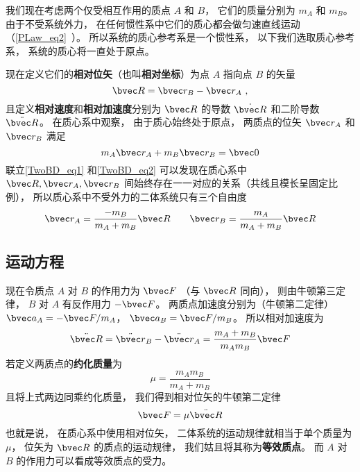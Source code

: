 

我们现在考虑两个仅受相互作用的质点 $A$ 和 $B$， 它们的质量分别为 $m_A$ 和 $m_B$。 由于不受系统外力， 在任何惯性系中它们的质心都会做匀速直线运动（\autoref{PLaw_eq2}~）。 所以系统的质心参考系是一个惯性系， 以下我们选取质心参考系， 系统的质心将一直处于原点。

现在定义它们的\textbf{相对位矢}（也叫\textbf{相对坐标}）为点 $A$ 指向点 $B$ 的矢量
\begin{equation}\label{TwoBD_eq1}
\bvec R = \bvec r_B - \bvec r_A~,
\end{equation}
且定义\textbf{相对速度}和\textbf{相对加速度}分别为 $\bvec R$ 的导数 $\dot{\bvec R}$ 和二阶导数 $\ddot{\bvec R}$。
在质心系中观察， 由于质心始终处于原点， 两质点的位矢 $\bvec r_A$ 和 $\bvec r_B$ 满足
\begin{equation}\label{TwoBD_eq2}
m_A \bvec r_A + m_B \bvec r_B = \bvec 0
\end{equation}
联立\autoref{TwoBD_eq1} 和\autoref{TwoBD_eq2} 可以发现在质心系中 $\bvec R, \bvec r_A, \bvec r_B$ 间始终存在一一对应的关系（共线且模长呈固定比例）， 所以质心系中不受外力的二体系统只有三个自由度
\begin{equation}\label{TwoBD_eq3}
\bvec r_A = \frac{-m_B}{m_A + m_B} \bvec R \qquad
\bvec r_B = \frac{m_A}{m_A + m_B} \bvec R
\end{equation}

\subsection{运动方程}

现在令质点 $A$ 对 $B$ 的作用力为 $\bvec F$ （与 $\bvec R$ 同向）， 则由牛顿第三定律， $B$ 对 $A$ 有反作用力 $- \bvec F$。 两质点加速度分别为（牛顿第二定律） $\bvec a_A =  -\bvec F/m_A$， $\bvec a_B =  \bvec F/m_B$。 所以相对加速度为
\begin{equation}
\ddot{\bvec R} = \ddot{\bvec r}_B - \ddot{\bvec r}_A = \frac{m_A+m_B}{m_Am_B} \bvec F
\end{equation}
若定义两质点的\textbf{约化质量}为
\begin{equation}
\mu = \frac{m_A m_B}{m_A + m_B}
\end{equation}
且将上式两边同乘约化质量， 我们得到相对位矢的牛顿第二定律
\begin{equation}\label{TwoBD_eq6}
\bvec F = \mu\ddot{\bvec R}
\end{equation}
也就是说， 在质心系中使用相对位矢， 二体系统的运动规律就相当于单个质量为 $\mu$， 位矢为 $\bvec R$ 的质点的运动规律， 我们姑且将其称为\textbf{等效质点}。 而 $A$ 对 $B$ 的作用力可以看成等效质点的受力。

